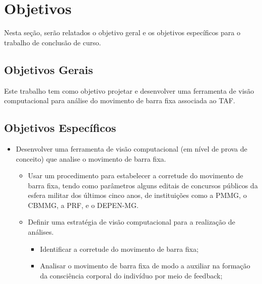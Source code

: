 \section{Objetivos}
Nesta seção, serão relatados o objetivo geral e os objetivos específicos para o trabalho de conclusão de curso.

\subsection{Objetivos Gerais}	
Este trabalho tem como objetivo projetar e desenvolver uma ferramenta de visão computacional para análise do movimento de barra fixa associada ao \ac{TAF}.

\subsection{Objetivos Específicos}	
\begin{itemize}

    \item Desenvolver uma ferramenta de visão computacional (em nível de prova de conceito) que analise o movimento de barra fixa.
    \begin{itemize}
        \item Usar um procedimento para estabelecer a corretude do movimento de barra fixa, tendo como parâmetros alguns editais de concursos públicos da esfera militar dos últimos cinco anos, de instituições como a \ac{PMMG}, o \ac{CBMMG}, a \ac{PRF}, e o \ac{DEPEN-MG}.
        \item Definir uma estratégia de visão computacional para a realização de análises.
        \begin{itemize}
            \item Identificar a corretude do movimento de barra fixa;
            \item Analisar o movimento de barra fixa de modo a auxiliar na formação da consciência corporal do indivíduo por meio de feedback;
        \end{itemize}
    \end{itemize}    
\end{itemize}


 
 